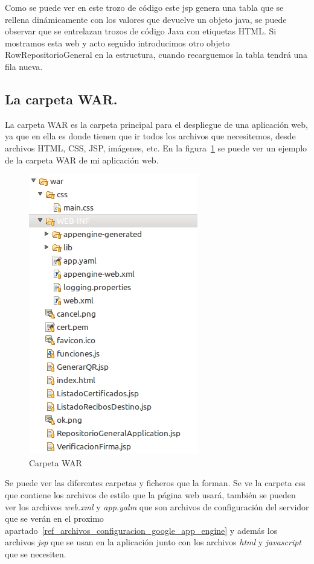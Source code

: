 Como se puede ver en este trozo de código este jsp genera una tabla que se rellena dinámicamente con los valores que devuelve un objeto java, se puede observar que se entrelazan trozos de código Java con etiquetas HTML. Si mostramos esta web y acto seguido introducimos otro objeto RowRepositorioGeneral en la estructura, cuando recarguemos la tabla tendrá una fila nueva.

\subsection{La carpeta WAR.}
La carpeta WAR es la carpeta principal para el despliegue de una aplicación web, ya que en ella es donde tienen que ir todos los archivos que necesitemos, desde archivos HTML, CSS, JSP, imágenes, etc. En la figura~\ref{fig:carpetawar} se puede ver un ejemplo de la carpeta WAR de mi aplicación web.

\begin{figure}[hbt]
  \centering
    \includegraphics{./GoogleAppEngine/imagenes/carpetawar.png}
  \caption{Carpeta WAR}
  \label{fig:carpetawar}
\end{figure}

Se puede ver las diferentes carpetas y ficheros que la forman. Se ve la carpeta css que contiene los archivos de estilo que la página web usará, también se pueden ver los archivos \textit{web.xml} y \textit{app.yalm} que son archivos de configuración del servidor que se verán en el proximo apartado~\ref{ref_archivos_configuracion_google_app_engine} y además los archivos \textit{jsp} que se usan en la aplicación junto con los archivos \textit{html} y \textit{javascript} que se necesiten.

